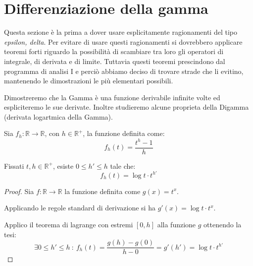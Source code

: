 \section{Differenziazione della gamma}\label{dg}
Questa sezione è la prima a dover usare esplicitamente ragionamenti del tipo \emph{epsilon, delta}.
Per evitare di usare questi ragionamenti si dovrebbero applicare teoremi forti riguardo la possibilità
di scambiare tra loro gli operatori di integrale, di derivata e di limite.
Tuttavia questi teoremi prescindono dal programma di analisi I e perciò abbiamo deciso di trovare strade
che li evitino, mantenendo le dimostrazioni le più elementari possibili.

Dimostreremo che la Gamma è una funzione derivabile infinite volte ed espliciteremo le sue derivate.
Inoltre studieremo alcune proprieta della Digamma (derivata logartmica della Gamma).

\begin{definition}
	Sia $f_h:\mathbb{R}\to\mathbb{R}$, con $h\in\mathbb{R^+}$, la funzione definita come:
	\begin{equation*}
		f_h(t)=\frac{t^h-1}h
	\end{equation*}

\end{definition}

\begin{lemma}\label{dg:LagrangeApprox}
	Fissati $t,h\in\mathbb{R^+}$, esiste $0\le h'\le h$ tale che:
	\begin{equation*}
		f_h(t)=\log{t}\cdot t^{h'}
	\end{equation*}
\end{lemma}
\begin{proof}
	Sia $f:\mathbb{R}\to\mathbb{R}$ la funzione definita come $g(x)=t^x$.
	
	Applicando le regole standard di derivazione si ha $g'(x)=\log{t}\cdot t^x$.
	
	Applico il teorema di lagrange con estremi $[0,h]$ alla funzione $g$ ottenendo la tesi:
	\begin{equation*}
		\exists 0\le h'\le h\ :\ f_h(t)=\frac{g(h)-g(0)}{h-0}=g'(h')=\log{t}\cdot t^{h'}
	\end{equation*}
\end{proof}



